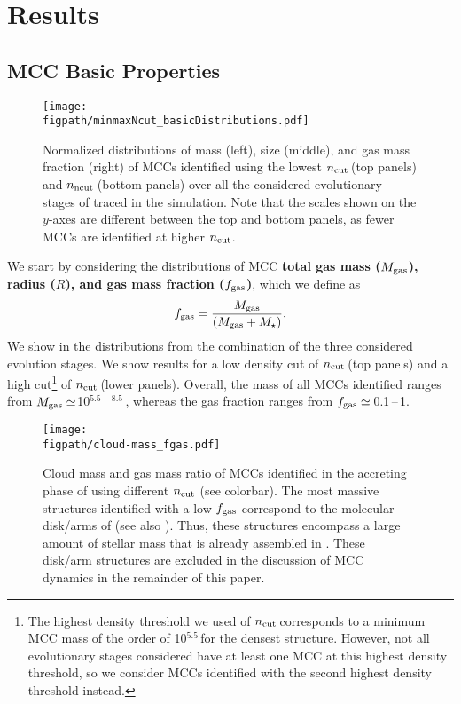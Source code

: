 \IfFileExists{emulateapjlegacy.cls}{\documentclass[iop]{emulateapjlegacy}}{\documentclass[iop]{emulateapj}}
\def\figpath{./Fig}
\begin{document}
\section{Results}\label{sec:results}

\subsection{MCC Basic Properties} \label{sec:dist}
\begin{figure*}[htbp]
\centering
\texttt{[image: \\figpath/minmaxNcut\_basicDistributions.pdf]}
\caption{Normalized distributions of mass (left), size (middle), and gas mass fraction (right) of MCCs identified using the lowest $n_{\rm cut}$\,\cc (top panels) and $n_{\rm ncut}$\,\cc (bottom panels) over all the considered evolutionary stages of \flower traced in the simulation. Note that the scales shown on the $y$-axes are different between the top and bottom panels, as fewer MCCs are identified at higher $n_{\rm cut}$.
\label{fig:dist}}
\end{figure*}

We start by considering the distributions of MCC {\bf total gas mass ($M_{\rm gas}$), radius ($R$), and gas mass fraction ($f_{\rm gas}$)}, 
which we define as
\begin{equation}
f_{\rm gas} = \frac{M_{\rm gas}} {\left(M_{\rm gas} + M_\star\right)}.
\end{equation}
%
We show in  the distributions from the combination of the three considered evolution stages. We show results for a low density cut of $n_{\rm cut}$\,\cc (top panels) and a high cut\footnote{The highest density threshold we used of $n_{\rm cut}$\,\cc corresponds to a minimum MCC mass of the order of 10$^{5.5}$\,\Msun for the densest structure. However, not all evolutionary stages considered have at least one MCC at this highest density threshold, so we consider MCCs identified with the second highest density threshold instead.} of $n_{\rm cut}$\,\cc (lower panels).
%
Overall, the mass of all MCCs identified ranges from $M_{\rm gas}\simeq$10$^{5.5-8.5}$\,\Msun,
whereas the gas fraction ranges from $f_{\rm gas} \simeq$\,0.1\,--\,1.

\begin{figure}
\centering
\texttt{[image: \\figpath/cloud-mass\_fgas.pdf]}
\caption{Cloud mass and gas mass ratio of MCCs identified in the accreting phase of \flower using different $n_{\rm cut}$ (see colorbar). The most massive structures identified with a low $f_{\rm gas}$ correspond to the molecular disk/arms of \flower (see also ).
%
Thus, these structures encompass a large amount of stellar mass that is already assembled in \flower. These disk/arm structures are excluded in the discussion of MCC dynamics in the remainder of this paper.
\label{fig:stellarRatio16}}
\end{figure}
\end{document}
